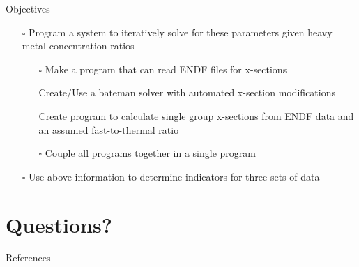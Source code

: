 \documentclass{beamer}
\newcommand{\cmark}{\ding{51}}%
\newcommand{\done}{\rlap{$\square$}{\raisebox{2pt}{\large\hspace{1pt}\cmark}}%
  \hspace{-2.5pt}}
\newcommand{\notdone}{$\square$}
\begin{document}
\begin{frame}[allowframebreaks]{Objectives}
\begin{itemize}
{  respect to one of the isotopes determined above}
  \begin{itemize}
  \item[\tiny\done]{\tiny Burnup}
  \item[\tiny\done]{\tiny Fluence Rate}
  \item[\tiny\done]{\tiny Initial Enrichment}
  \item[\tiny\done]{\tiny Fuel Age}
  \item[\tiny\notdone]{\tiny Fast-to-thermal ratios (requires iteration)}
  \end{itemize}
\item[\notdone]{\small Program a system to iteratively solve for these parameters
  given heavy metal concentration
  ratios}
  \begin{itemize}
  \item[\tiny\notdone]{\tiny Make a program that can read ENDF files for x-sections}
  \item[\tiny\done]{\tiny Create/Use a bateman solver with automated x-section modifications}
  \item[\tiny\done]{\tiny Create program to calculate single group x-sections from
    ENDF data and an assumed
    fast-to-thermal ratio}
  \item[\tiny\notdone]{\tiny Couple all programs together in a single program} 
  \end{itemize}
\item[\notdone]{\small Use above information to determine indicators for three sets of data}
\end{itemize}
\end{frame}




\appendix
\section{Questions?}
\begin{frame}
\sectionpage
\end{frame}


\begin{frame}[allowframebreaks]{References}
\def\newblock{}
\nocite{*}
\scriptsize{}

\end{frame}
\end{document}
